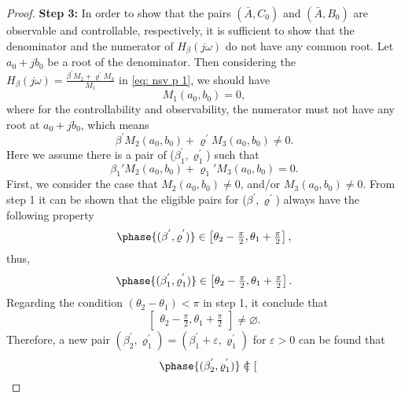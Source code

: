 \begin{proof}
\textbf{Step 3:}
In order to show that the pairs $(\bar{A},C_0)$ and $(\bar{A},B_0)$ are observable and controllable, respectively, it is sufficient to show that the denominator and the numerator of $H_\beta (j\omega)$ do not have any common root. Let $a_0 + jb_0$ be a root of the denominator. Then considering the $H_\beta(j\omega)=\frac{\beta^{'}M_2+\varrho^{'}M_3}{M_1}$ in \eqref{eq: nsv p 1}, we should have
\begin{equation}
    M_1(a_0,b_0)=0,
\end{equation}
where for the controllability and observability, the numerator must not have any root at $a_0 + jb_0$, which means
\begin{equation}
   \beta^{'} M_2(a_0,b_0)+\varrho^{'}M_3(a_0,b_0)\neq0.
\end{equation}
Here we assume there is a pair of ($\beta_1 ^{'}, \varrho_1 ^{'}$) such that
 \begin{equation}
 \label{eq: old pair}
    \beta_1 ' M_2(a_0,b_0)+\varrho_1 'M_3(a_0,b_0)=0.
\end{equation}
First, we consider the case that $M_2(a_0,b_0)\neq0$, and/or $M_3(a_0,b_0)\neq0$. From step 1 it can be shown that the eligible pairs for ($\beta^{'}, \varrho^{'}$) always have the following property
\begin{equation}
   \phase{(\beta ^{'}, \varrho ^{'})} \in \begin{bmatrix}
    \theta_2-\frac{\pi}{2}, \theta_1+\frac{\pi}{2}
\end{bmatrix},
\end{equation}
thus,
\begin{equation}
   \phase{(\beta_1 ^{'}, \varrho_1 ^{'})} \in \begin{bmatrix}
    \theta_2-\frac{\pi}{2}, \theta_1+\frac{\pi}{2}
\end{bmatrix}.
\end{equation}
Regarding the condition $(\theta_2-\theta_1)<\pi$ in step 1, it conclude that
\begin{equation}
    \begin{bmatrix}
    \theta_2-\frac{\pi}{2}, \theta_1+\frac{\pi}{2}
\end{bmatrix}\neq \varnothing.
\end{equation}
Therefore, a new pair $(\beta_2^{'}, \varrho_1^{'})=(\beta_1^{'}+\varepsilon, \varrho_1^{'})$ for $\varepsilon>0$ can be found that
\begin{equation}
   \phase{(\beta_2 ^{'}, \varrho_1 ^{'})} \in \begin{bmatrix}

\end{bmatrix}
\end{equation}
\end{proof}
